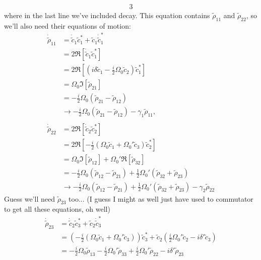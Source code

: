 \documentclass[12pt]{article}
\begin{document}
\begin{enumerate}[label=(\alph*)]
\begin{alignat*}{3}
    \end{alignat*}
    where in the last line we've included decay. This equation contains $\tilde{\rho}_{11}$ and $\tilde{\rho}_{22}$, so we'll also need their equations of motion:
    \begin{align*}
        \dot{\tilde{\rho}}_{11} &= \dot{\tilde{c}}_1\tilde{c}_1^* + \tilde{c}_1\dot{\tilde{c}}_1^* \\
        &= 2\Re[\dot{\tilde{c}}_1\tilde{c}_1^*] \\
        &= 2\Re\left[\left(i\delta\tilde{c}_1 - \frac{i}{2}\Omega_0\tilde{c}_2\right)\tilde{c}_1^*\right] \\
        &= \Omega_0 \Im\left[\tilde{\rho}_{21}\right] \\
        &= -\frac{i}{2}\Omega_0\left(\tilde{\rho}_{21} - \tilde{\rho}_{12}\right) \\
        &\to -\frac{i}{2}\Omega_0\left(\tilde{\rho}_{21} - \tilde{\rho}_{12}\right) - \gamma_1\tilde{\rho}_{11},
        \\ \\
        \dot{\tilde{\rho}}_{22} &= 2\Re[\dot{\tilde{c}}_2\tilde{c}_2^*] \\
        &= 2\Re\left[-\frac{i}{2}\left(\Omega_0\tilde{c}_1 + \Omega_0'\tilde{c}_3\right)\tilde{c}_2^*\right] \\
        &= \Omega_0\Im\left[\tilde{\rho}_{12}\right] + \Omega_0'\Re\left[\tilde{\rho}_{32}\right] \\
        &= -\frac{i}{2}\Omega_0\left(\tilde{\rho}_{12} - \tilde{\rho}_{21}\right) + \frac{1}{2}\Omega_0'\left(\tilde{\rho}_{32} + \tilde{\rho}_{23}\right) \\
        &\to -\frac{i}{2}\Omega_0\left(\tilde{\rho}_{12} - \tilde{\rho}_{21}\right) + \frac{1}{2}\Omega_0'\left(\tilde{\rho}_{32} + \tilde{\rho}_{23}\right) - \gamma_2\tilde{\rho}_{22}
    \end{align*}
    Guess we'll need $\tilde{\rho}_{23}$ too... (I guess I might as well just have used to commutator to get all these equations, oh well)
    \begin{align*}
        \dot{\tilde{\rho}}_{23} &= \dot{\tilde{c}}_2\tilde{c}_3^* + \tilde{c}_2\dot{\tilde{c}}_3^* \\
        &= \left(-\frac{i}{2}\left(\Omega_0\tilde{c}_1 + \Omega_0'\tilde{c}_3\right)\right)\tilde{c}_3^* + \tilde{c}_2\left(\frac{i}{2}\Omega_0' \tilde{c}_2 - i\delta'\tilde{c}_3\right) \\
        &= -\frac{i}{2}\Omega_0\tilde{\rho}_{13} - \frac{i}{2}\Omega_0'\tilde{\rho}_{33} + \frac{i}{2}\Omega_0'\tilde{\rho}_{22} - i\delta'\tilde{\rho}_{23} \\

\end{align*}
\end{enumerate}
\end{document}
